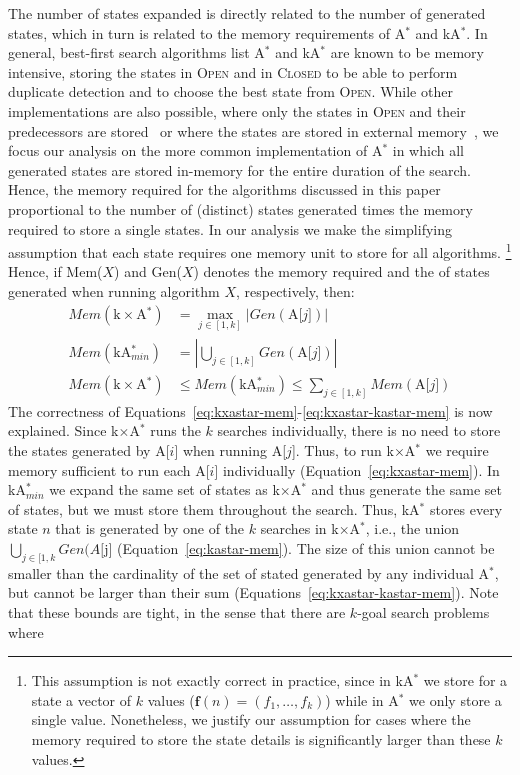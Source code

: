 \documentclass{aicom2e}
\newcommand{\kgs}{$k$-goal search}
\newcommand{\astar}{A$^*$}
\newcommand{\kastar}{kA$^*$}
\newcommand{\kastarmin}{kA$^*_{min}$}
\newcommand{\kxastar}{k$\times$A$^*$}
\newcommand{\astari}[1]{A[$#1$]}
\newcommand{\open}{\textsc{Open}}
\newcommand{\closed}{\textsc{Closed}}
\begin{document}
The number of states expanded is directly related to the number of generated states,
which in turn is related to the memory requirements of \astar{} and \kastar{}. 
In general, best-first search algorithms list \astar{} and \kastar{} are known to be memory intensive, 
storing the states in \open{} and in \closed{} to be able to perform duplicate detection 
and to choose the best state from \open{}. 
While other implementations are also possible, where only the states in \open{} and their predecessors are stored~\cite{zhou2006breadth,korf2004best} or where the states are stored in external memory~\cite{zhou2004structured,edelkamp2016external,edelkamp2005external}, we focus our analysis on the more common implementation of \astar{} in which all generated states are stored in-memory for the entire duration of the search. 
Hence, the memory required for the algorithms discussed in this paper proportional to the number of (distinct) states generated times the memory required to store a single states. %
In our analysis we make the simplifying assumption that each state requires one memory unit to store for all algorithms. 
\footnote{This assumption is not exactly correct in practice, since in \kastar{} we store for a state a vector of $k$ values ($\textbf{f}(n)=(f_1,\ldots,f_k)$)  while in \astar{} we only store a single value. Nonetheless, we justify our assumption for cases where the memory required to store the state details is significantly larger than these $k$ values.} 
Hence, if Mem($X$) and Gen($X$) denotes the memory required and the of states generated when running algorithm $X$, respectively, then:
\begin{align}
Mem(\text{\kxastar{}})&=\max_{j\in [1,k]}| Gen(\text{\astari{j}})| \label{eq:kxastar-mem}\\
Mem(\text{\kastarmin{}})&=|\bigcup_{j\in [1,k]} Gen(\text{\astari{j}})| \label{eq:kastar-mem}\\
Mem(\text{\kxastar{}})&\leq Mem(\text{\kastarmin{}}) \leq \sum_{j\in[1,k]} Mem(\text{\astari{j}}) \label{eq:kxastar-kastar-mem}
\end{align}
The correctness of Equations~\ref{eq:kxastar-mem}-\ref{eq:kxastar-kastar-mem} is now explained. 
Since \kxastar{} runs the $k$ searches individually, there is no need to store the states generated by \astari{i} when running \astari{j}. Thus, to run \kxastar{} we require memory sufficient to run each \astari{i} individually (Equation~\ref{eq:kxastar-mem}). In \kastarmin{} we expand the same set of states as \kxastar{} and thus generate the same set of states, but we must store them throughout the search. Thus, \kastar{} stores every state $n$ that is  generated by one of the $k$ searches in \kxastar{}, i.e., the union $\bigcup_{j\in[1,k}Gen(\astari{j}$ (Equation~\ref{eq:kastar-mem}). The size of this union cannot be smaller than the cardinality of the set of stated generated by any individual \astar{}, but cannot be larger than their sum (Equations~\ref{eq:kxastar-kastar-mem}). Note that these bounds are tight, in the sense that there are \kgs{} problems where 
\end{document}

